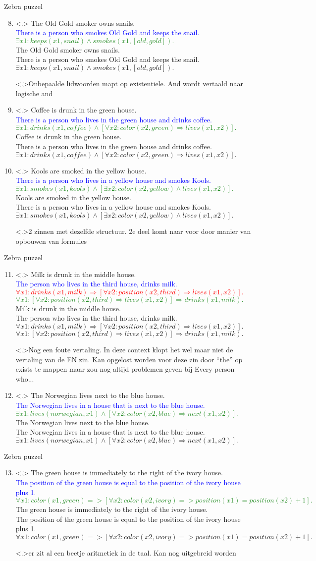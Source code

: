 \documentclass[notes, dvipsnames]{beamer}
\newcommand{\hitem}{
	\ppause
	\item
}
\newcommand{\ppause}{\onslide<+>}
\newcommand{\nnote}[1]{\note<.>{#1}}
\newcommand{\sentence}[3]{
  \alt<.>{
    #1 \\
    \textcolor{Blue}{#2} \\
    \textcolor{ForestGreen}{#3} \\
  }{
    #1 \\
    #2 \\
    #3 \\
  }
}
\newcommand{\badsentence}[4]{
  \alt<.>{
    #1 \\
    \textcolor{Blue}{#2} \\
    \textcolor{Red}{#3} \\
    \textcolor{ForestGreen}{#4} \\
  }{
    #1 \\
    #2 \\
    #3 \\
    #4 \\
  }
}
\begin{document}
  \begin{frame}{Zebra puzzel\cite{ZebraPuzzle}}
    \begin{enumerate}
      \setcounter{enumi}{7}
      \hitem \sentence{The Old Gold smoker owns snails.}{There is a person who smokes Old Gold and keeps the snail.}{$\exists x1: keeps(x1,snail) \land smokes(x1,[old,gold]).$}
      \nnote{Onbepaalde lidwoorden mapt op existentiele. And wordt vertaald naar logische and}
      \hitem \sentence{Coffee is drunk in the green house.}{There is a person who lives in the green house and drinks coffee.}{$\exists x1: drinks(x1,coffee) \land [\forall x2: color(x2,green) \Rightarrow lives(x1,x2)].$}
      \item \sentence{Kools are smoked in the yellow house.}{There is a person who lives in a yellow house and smokes Kools.}{$\exists x1: smokes(x1,kools) \land [\exists x2: color(x2,yellow) \land lives(x1,x2)].$}
      \nnote{2 zinnen met dezelfde structuur. 2e deel komt naar voor door manier van opbouwen van formules}
    \end{enumerate}
  \end{frame}
  \begin{frame}{Zebra puzzel\cite{ZebraPuzzle}}
    \begin{enumerate}
      \setcounter{enumi}{10}
      \hitem \badsentence{Milk is drunk in the middle house.}{The person who lives in the third house, drinks milk.}{$\forall x1: drinks(x1,milk) \Rightarrow [\forall x2: position(x2,third) \Rightarrow lives(x1,x2)].$}{$\forall x1: [\forall x2: position(x2,third) \Rightarrow lives(x1,x2)] \Rightarrow drinks(x1, milk).$}
      \nnote{Nog een foute vertaling. In deze context klopt het wel maar niet de vertaling van de EN zin. Kan opgelost worden voor deze zin door ``the'' op exists te mappen maar zou nog altijd problemen geven bij Every person who...}
      \hitem \sentence{The Norwegian lives next to the blue house.}{The Norwegian lives in a house that is next to the blue house.}{$\exists x1: lives(norwegian,x1) \land [\forall x2: color(x2,blue) \Rightarrow next(x1,x2)].$}
    \end{enumerate}
  \end{frame}
  \begin{frame}{Zebra puzzel\cite{ZebraPuzzle}}
    \begin{enumerate}
      \setcounter{enumi}{12}
      \hitem \sentence{The green house is immediately to the right of the ivory house.}{The position of the green house is equal to the position of the ivory house plus 1.}{$\forall x1: color(x1,green) => [\forall x2: color(x2,ivory) => position(x1)=position(x2)+1].$} 
      \nnote{er zit al een beetje aritmetiek in de taal. Kan nog uitgebreid worden}
    \end{enumerate}
  \end{frame}
\end{document}
